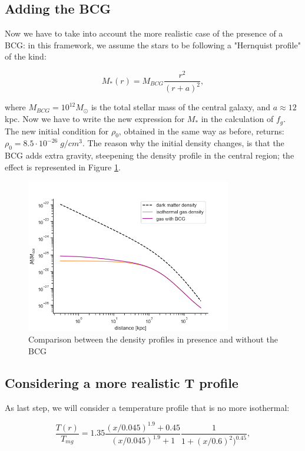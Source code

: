 \documentclass{article}
\begin{document}
\newpage
\subsection{Adding the BCG}
Now we have to take into account the more realistic case of the presence of a BCG: in this framework, we assume the stars to be following a "Hernquist profile" of the kind:

\begin{equation}
M_{*}(r)=M_{BCG}\frac{r^{2}}{(r+a)^2},
\end{equation}

where \(M_{BCG}=10^{12}M_{\odot}\) is the total stellar mass of the central galaxy, and $a \approx 12 $kpc. Now we have to write the new expression for \(M_{*}\) in the calculation of \(f_{g}\). 
The new initial condition for \(\rho_{0}\), obtained in the same way as before, returns: \(\rho_{0}=8.5\cdot 10^{-26}\;g/cm^{3}\).
The reason why the initial density changes, is that the BCG adds extra gravity, steepening the density profile in the central region; the effect is represented in Figure \ref{fig:figure2}.

\begin{figure}[hb]
\includegraphics[width=0.8\textwidth]{gas2.png}
\caption{Comparison between the density profiles in presence and without the BCG}
\label{fig:figure2}
\end{figure}

\newpage
\subsection{Considering a more realistic T profile}
As last step, we will consider a temperature profile that is no more isothermal:

\begin{equation}
\frac{T(r)}{T_{mg}}=1.35\frac{(x/0.045)^{1.9}+0.45}{(x/0.045)^{1.9}+1}\frac{1}{1+(x/0.6)^{2})^{0.45}},
\end{equation}
\end{document}
